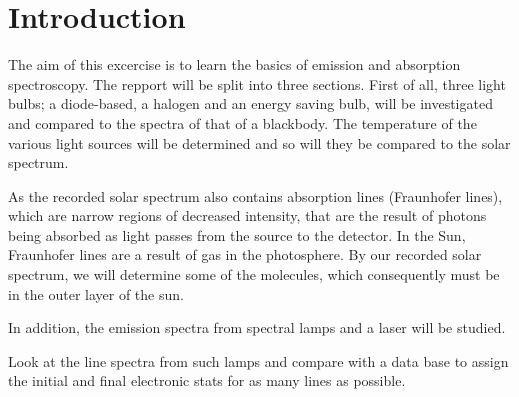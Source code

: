 \section{Introduction}

The aim of this excercise is to learn the basics of emission and absorption
spectroscopy. The repport will be split into three sections. First of all,
three light bulbs; a diode-based, a halogen and an energy saving bulb, will be
investigated and compared to the spectra of that of a blackbody. The
temperature of the various light sources will be determined and so will they be
compared to the solar spectrum. 

As the recorded solar spectrum also contains absorption lines (Fraunhofer lines), which are
narrow regions of decreased intensity, that are the result of
photons being absorbed as light passes from the source to the detector. In the
Sun, Fraunhofer lines are a result of gas in the photosphere. By our
recorded solar spectrum, we will determine some of the molecules, which
consequently must be in the outer layer of the sun. 

In addition, the emission spectra from spectral lamps and a laser will be studied.

Look at the line spectra from such lamps and compare with a data base to assign
the initial and final electronic stats for as many lines as possible. 




